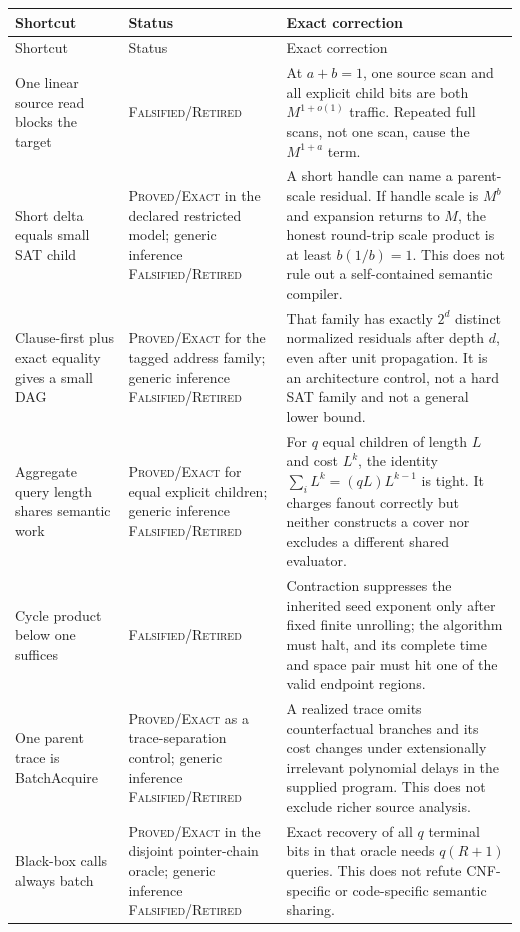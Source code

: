 \documentclass[11pt]{article}
\newcommand{\Exact}{\textsc{Proved/Exact}}
\newcommand{\Retired}{\textsc{Falsified/}\allowbreak\textsc{Retired}}
\begin{document}
\begin{longtable}{L{0.24\textwidth}L{0.205\textwidth}L{0.475\textwidth}}
\toprule
Shortcut & Status & Exact correction \\
\midrule
\endfirsthead
\toprule
Shortcut & Status & Exact correction \\
\midrule
\endhead
\bottomrule
\endfoot
One linear source read blocks the target & \Retired{} & At
$a+b=1$, one source scan and all explicit child bits are both
$M^{1+o(1)}$ traffic.  Repeated full scans, not one scan, cause the
$M^{1+a}$ term. \\
Short delta equals small SAT child & \Exact{} in the declared restricted
model; generic inference \Retired{} & A short handle can name a parent-scale
residual.  If handle scale is $M^b$ and expansion returns to $M$, the honest
round-trip scale product is at least $b(1/b)=1$.  This does not rule out a
self-contained semantic compiler. \\
Clause-first plus exact equality gives a small DAG & \Exact{} for the tagged
address family; generic inference \Retired{} & That family has exactly
$2^d$ distinct normalized residuals after depth $d$, even after unit
propagation.  It is an architecture control, not a hard SAT family and not a
general lower bound. \\
Aggregate query length shares semantic work & \Exact{} for equal explicit
children; generic inference \Retired{} & For $q$ equal children of length
$L$ and cost $L^k$, the identity $\sum_iL^k=(qL)L^{k-1}$ is tight.  It
charges fanout correctly but neither constructs a cover nor excludes a
different shared evaluator. \\
Cycle product below one suffices & \Retired{} & Contraction suppresses the
inherited seed exponent only after fixed finite unrolling; the algorithm must
halt, and its complete time and space pair must hit one of the valid endpoint
regions. \\
One parent trace is BatchAcquire & \Exact{} as a trace-separation control;
generic inference \Retired{} & A realized trace omits counterfactual branches
and its cost changes under extensionally irrelevant polynomial delays in the
supplied program.  This does not exclude richer source analysis. \\
Black-box calls always batch & \Exact{} in the disjoint pointer-chain oracle;
generic inference \Retired{} & Exact recovery of all $q$ terminal bits in
that oracle needs $q(R+1)$ queries.  This does not refute CNF-specific or
code-specific semantic sharing. \\
\end{longtable}
\end{document}
